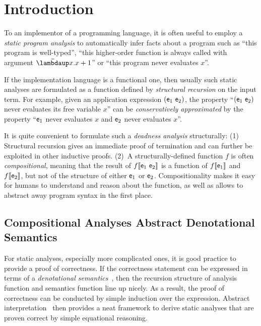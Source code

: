\section{Introduction}
\label{sec:introduction}

To an implementor of a programming language, it is often useful to employ a
\emph{static program analysis} to automatically infer facts about a program such
as ``this program is well-typed'', ``this higher-order function is always called
with argument $\Lam{x}{x+1}$'' or ``this program never evaluates $x$''.

If the implementation language is a functional one, then usually such static
analyses are formulated as a function defined by \emph{structural recursion} on
the input term.
For example, given an application expression $(\mathsf{e}_1~\mathsf{e}_2)$,
the property ``$(\mathsf{e}_1~\mathsf{e}_2)$ never evaluates its free variable $x$'' can be
\emph{conservatively approximated} by the property ``$\mathsf{e}_1$ never evaluates $x$
and $\mathsf{e}_2$ never evaluates $x$''.

It is quite convenient to formulate such a \emph{deadness analysis}
structurally:
(1) Structural recursion gives an immediate proof of termination and can
    further be exploited in other inductive proofs.
(2)~A structurally-defined function $f$ is often \emph{compositional}, meaning that
    the result of $f\llbracket {\mathsf{e}_1~\mathsf{e}_2} \rrbracket$ is a function of $f\llbracket {\mathsf{e}_1} \rrbracket$ and
    $f\llbracket {\mathsf{e}_2} \rrbracket$, but not of the structure of either $\mathsf{e}_1$ or $\mathsf{e}_2$.
    Compositionality makes it easy for humans to understand and reason about the
    function, as well as allows to abstract away program syntax in the first
    place.

\subsection{Compositional Analyses Abstract Denotational Semantics}

For static analyses, especially more complicated ones, it is good practice to
provide a proof of correctness.
If the correctness statement can be expressed in terms of a \emph{denotational
semantics}~\citep{ScottStrachey:71}, then the recursion structure of analysis
function and semantics function line up nicely.
As a result, the proof of correctness can be conducted by simple induction
over the expression. Abstract interpretation~\citep{Cousot:21} then provides
a neat framework to derive static analyses that are proven correct by simple
equational reasoning.

